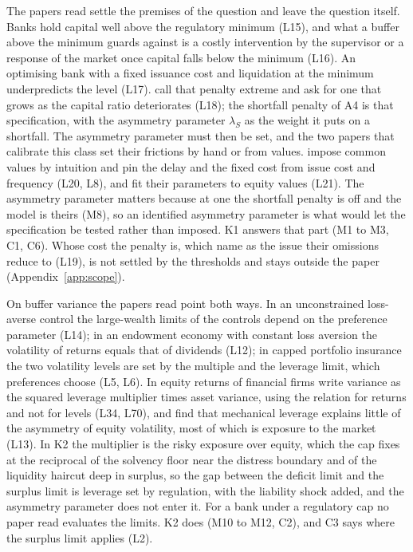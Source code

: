 The papers read settle the premises of the question and leave the question
itself. Banks hold capital well above the regulatory minimum (L15), and what a
buffer above the minimum guards against is a costly intervention by the supervisor or a response
of the market once capital falls below the minimum (L16). An optimising bank
with a fixed issuance cost and liquidation at the minimum underpredicts the
level (L17). \citet{peura2006} call that penalty extreme and ask for one that
grows as the capital ratio deteriorates (L18); the shortfall penalty of A4 is
that specification, with the asymmetry parameter $\lambda_S$ as the weight it
puts on a shortfall. The asymmetry parameter must then be set,
and the two papers that calibrate this class set their frictions by hand or
from values. \citet{peura2006} impose common values by intuition and pin the
delay and the fixed cost from issue cost and frequency (L20, L8), and
\citet{daihuangkeppo2019} fit their parameters to equity values (L21). The
asymmetry parameter matters because at one the shortfall penalty is off and the
model is theirs (M8), so an identified asymmetry parameter is what would let the specification be tested rather than imposed. K1 answers
that part (M1 to M3, C1, C6). Whose cost the penalty is, which \citet{peura2006} name as the
issue their omissions reduce to (L19), is not settled by the thresholds and
stays outside the paper (Appendix~\ref{app:scope}).

On buffer variance the papers read point both ways. In an
unconstrained loss-averse control the large-wealth limits of the controls
depend on the preference parameter (L14); in an endowment economy with
constant loss aversion the volatility of returns equals that of dividends
(L12); in capped portfolio insurance the two volatility levels are set by the
multiple and the leverage limit, which preferences choose (L5, L6). In equity
returns of financial firms \citet{engle2018} write variance as the squared
leverage multiplier times asset variance, using the relation for returns and
not for levels (L34, L70), and find that mechanical leverage explains little of
the asymmetry of equity volatility, most of which is exposure to the market
(L13). In K2 the multiplier is the risky exposure over equity, which the cap
fixes at the reciprocal of the solvency floor near the distress boundary and
of the liquidity haircut deep in surplus, so the gap between the deficit limit
and the surplus limit is leverage set by regulation, with the liability shock
added, and the asymmetry parameter does not enter it. For a bank under a
regulatory cap no paper read evaluates the limits. K2 does (M10 to M12, C2),
and C3 says where the surplus limit applies (L2).

